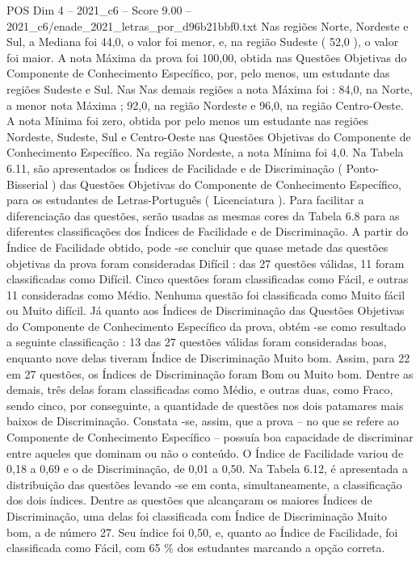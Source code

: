 \begin{textsample}{POS Dim 4 – 2021\_c6 – Score 9.00 – 2021\_c6/enade\_2021\_letras\_por\_d96b21bbf0.txt}
Nas regiões Norte, Nordeste e Sul, a Mediana foi 44,0, o valor foi menor, e, na região Sudeste ( 52,0 ), o valor foi maior.
A nota Máxima da prova foi 100,00, obtida nas Questões Objetivas do Componente de Conhecimento Específico, por, pelo menos, um estudante das regiões Sudeste e Sul.
Nas Nas demais regiões a nota Máxima foi : 84,0, na Norte, a menor nota Máxima ; 92,0, na região Nordeste e 96,0, na região Centro-Oeste.
A nota Mínima foi zero, obtida por pelo menos um estudante nas regiões Nordeste, Sudeste, Sul e Centro-Oeste nas Questões Objetivas do Componente de Conhecimento Específico.
Na região Nordeste, a nota Mínima foi 4,0.
Na Tabela 6.11, são apresentados os Índices de Facilidade e de Discriminação ( Ponto-Bisserial ) das Questões Objetivas do Componente de Conhecimento Específico, para os estudantes de Letras-Português ( Licenciatura ).
Para facilitar a diferenciação das questões, serão usadas as mesmas cores da Tabela 6.8 para as diferentes classificações dos Índices de Facilidade e de Discriminação.
A partir do Índice de Facilidade obtido, pode -se concluir que quase metade das questões objetivas da prova foram consideradas Difícil : das 27 questões válidas, 11 foram classificadas como Difícil.
Cinco questões foram classificadas como Fácil, e outras 11 consideradas como Médio.
Nenhuma questão foi classificada como Muito fácil ou Muito difícil.
Já quanto aos Índices de Discriminação das Questões Objetivas do Componente de Conhecimento Específico da prova, obtém -se como resultado a seguinte classificação : 13 das 27 questões válidas foram consideradas boas, enquanto nove delas tiveram Índice de Discriminação Muito bom.
Assim, para 22 em 27 questões, os Índices de Discriminação foram Bom ou Muito bom.
Dentre as demais, três delas foram classificadas como Médio, e outras duas, como Fraco, sendo cinco, por conseguinte, a quantidade de questões nos dois patamares mais baixos de Discriminação.
Constata -se, assim, que a prova – no que se refere ao Componente de Conhecimento Específico – possuía boa capacidade de discriminar entre aqueles que dominam ou não o conteúdo.
O Índice de Facilidade variou de 0,18 a 0,69 e o de Discriminação, de 0,01 a 0,50.
Na Tabela 6.12, é apresentada a distribuição das questões levando -se em conta, simultaneamente, a classificação dos dois índices.
Dentre as questões que alcançaram os maiores Índices de Discriminação, uma delas foi classificada com Índice de Discriminação Muito bom, a de número 27.
Seu índice foi 0,50, e, quanto ao Índice de Facilidade, foi classificada como Fácil, com 65 \% dos estudantes marcando a opção correta.

\end{textsample}
